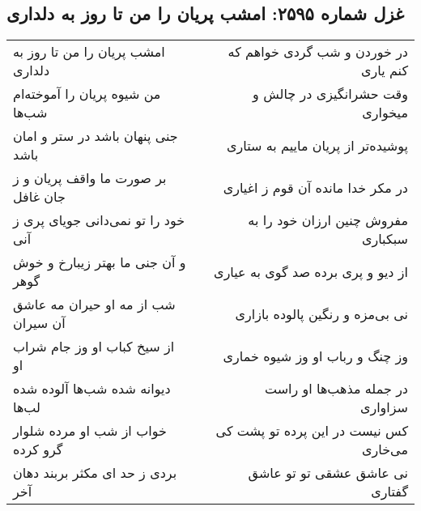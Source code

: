 \begin{center}
\section*{غزل شماره ۲۵۹۵: امشب پریان را من تا روز به دلداری}
\label{sec:2595}
\begin{longtable}{l p{0.5cm} r}
امشب پریان را من تا روز به دلداری
&&
در خوردن و شب گردی خواهم که کنم یاری
\\
من شیوه پریان را آموخته‌ام شب‌ها
&&
وقت حشرانگیزی در چالش و میخواری
\\
جنی پنهان باشد در ستر و امان باشد
&&
پوشیده‌تر از پریان ماییم به ستاری
\\
بر صورت ما واقف پریان و ز جان غافل
&&
در مکر خدا مانده آن قوم ز اغیاری
\\
خود را تو نمی‌دانی جویای پری ز آنی
&&
مفروش چنین ارزان خود را به سبکباری
\\
و آن جنی ما بهتر زیبارخ و خوش گوهر
&&
از دیو و پری برده صد گوی به عیاری
\\
شب از مه او حیران مه عاشق آن سیران
&&
نی بی‌مزه و رنگین پالوده بازاری
\\
از سیخ کباب او وز جام شراب او
&&
وز چنگ و رباب او وز شیوه خماری
\\
دیوانه شده شب‌ها آلوده شده لب‌ها
&&
در جمله مذهب‌ها او راست سزاواری
\\
خواب از شب او مرده شلوار گرو کرده
&&
کس نیست در این پرده تو پشت کی می‌خاری
\\
بردی ز حد ای مکثر بربند دهان آخر
&&
نی عاشق عشقی تو تو عاشق گفتاری
\\
\end{longtable}
\end{center}

